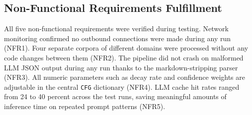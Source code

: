\subsection{Non-Functional Requirements Fulfillment}

All five non-functional requirements were verified during testing. Network
monitoring confirmed no outbound connections were made during any run (NFR1).
Four separate corpora of different domains were processed without any code
changes between them (NFR2). The pipeline did not crash on malformed LLM JSON
output during any run thanks to the markdown-stripping parser (NFR3). All
numeric parameters such as decay rate and confidence weights are adjustable in
the central \texttt{CFG} dictionary (NFR4). LLM cache hit rates ranged from
24 to 40 percent across the test runs, saving meaningful amounts of inference
time on repeated prompt patterns (NFR5).


